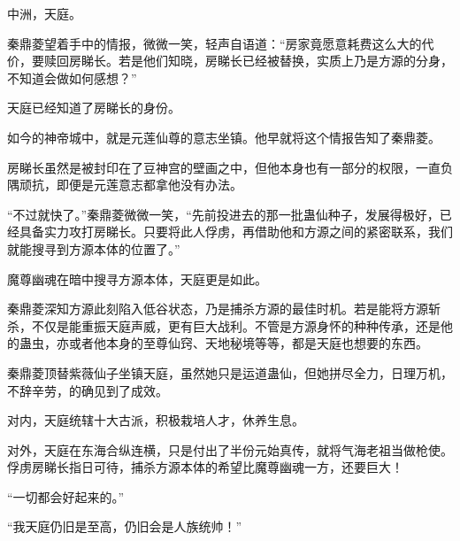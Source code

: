 \begin{this_body}
中洲，天庭。

秦鼎菱望着手中的情报，微微一笑，轻声自语道：“房家竟愿意耗费这么大的代价，要赎回房睇长。若是他们知晓，房睇长已经被替换，实质上乃是方源的分身，不知道会做如何感想？”

天庭已经知道了房睇长的身份。

如今的神帝城中，就是元莲仙尊的意志坐镇。他早就将这个情报告知了秦鼎菱。

房睇长虽然是被封印在了豆神宫的壁画之中，但他本身也有一部分的权限，一直负隅顽抗，即便是元莲意志都拿他没有办法。

“不过就快了。”秦鼎菱微微一笑，“先前投进去的那一批蛊仙种子，发展得极好，已经具备实力攻打房睇长。只要将此人俘虏，再借助他和方源之间的紧密联系，我们就能搜寻到方源本体的位置了。”

魔尊幽魂在暗中搜寻方源本体，天庭更是如此。

秦鼎菱深知方源此刻陷入低谷状态，乃是捕杀方源的最佳时机。若是能将方源斩杀，不仅是能重振天庭声威，更有巨大战利。不管是方源身怀的种种传承，还是他的蛊虫，亦或者他本身的至尊仙窍、天地秘境等等，都是天庭也想要的东西。

秦鼎菱顶替紫薇仙子坐镇天庭，虽然她只是运道蛊仙，但她拼尽全力，日理万机，不辞辛劳，的确见到了成效。

对内，天庭统辖十大古派，积极栽培人才，休养生息。

对外，天庭在东海合纵连横，只是付出了半份元始真传，就将气海老祖当做枪使。俘虏房睇长指日可待，捕杀方源本体的希望比魔尊幽魂一方，还要巨大！

“一切都会好起来的。”

“我天庭仍旧是至高，仍旧会是人族统帅！”

\end{this_body}

